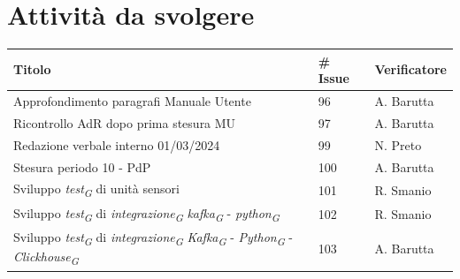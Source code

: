 \documentclass{article}
\begin{document}
    \section{Attività da svolgere}
    \begin{center}
        \begin{tabular}{|C{7cm}|C{1,5cm}|C{3cm}|}
            \hline
            \textbf{Titolo} & \textbf{\# Issue} & \textbf{Verificatore} \\
            \hline
            \hline
            Approfondimento paragrafi Manuale Utente & 96 & A. Barutta \\
            \hline
            Ricontrollo AdR dopo prima stesura MU & 97 & A. Barutta \\
            \hline
            Redazione verbale interno 01/03/2024 & 99 & N. Preto \\
            \hline
            Stesura periodo 10 - PdP & 100 & A. Barutta \\
            \hline
            Sviluppo \textit{test}\textsubscript{\textit{G}} di unità sensori & 101 & R. Smanio \\
            \hline
            Sviluppo \textit{test}\textsubscript{\textit{G}} di \textit{integrazione}\textsubscript{\textit{G}} \textit{kafka}\textsubscript{\textit{G}} - \textit{python}\textsubscript{\textit{G}} & 102 & R. Smanio \\
            \hline
            Sviluppo \textit{test}\textsubscript{\textit{G}} di \textit{integrazione}\textsubscript{\textit{G}} \textit{Kafka}\textsubscript{\textit{G}} - \textit{Python}\textsubscript{\textit{G}} - \textit{Clickhouse}\textsubscript{\textit{G}} & 103 & A. Barutta \\
            \hline
        \end{tabular}
    \end{center}
\end{document}

